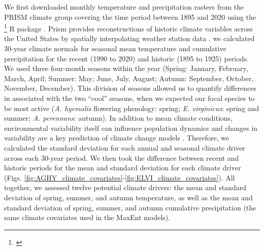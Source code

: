 \documentclass[11pt]{article}
\let\cite\citep
\newcommand{\tom}[2]{{\color{red}{#1}}\footnote{\textit{\color{red}{#2}}}}
\newcommand{\revise}[1]{{\color{Mahogany}{#1}}}
\begin{document}
We first downloaded monthly temperature and precipitation rasters from the PRISM climate group \citep{daly2013prism} covering the time period between 1895 and 2020 using the \tom{'prism'}{Other package names are not 'quoted'.} R package \citep{Rprism2015}. 
Prism provides reconstructions of historic climate variables across the United States by spatially interpolating weather station data \citep{diLuzio2008constructing}. 
\linelabel{R3C3-begin}\revise{Because the magnitude of observed climate change differs across seasons, and because different growing seasons is a key feature of the biology of our focal host species,} we calculated 30-year climate normals for seasonal mean temperature and cumulative precipitation for the recent (1990 to 2020) and historic (1895 to 1925) periods.
We used three four-month seasons within the year (Spring: January, February, March, April; Summer: May; June, July, August; Autumn: September, October, November, December). 
This division of seasons allowed us to quantify differences in \revise{the primary climate change drivers, temperature and precipitation,} associated with the two ``cool'' seasons, when we expected our focal species to be most active (\emph{A. hyemalis} flowering phenology: spring; \emph{E. virginicus}: spring and summer; \emph{A. perennans}: autumn). 
In addition to mean climate conditions, environmental variability itself can influence population dynamics \cite{tuljapurkar_population_1982} and changes in variability are a key prediction of climate change models \cite{stocker2013technical, ipcc_2021}. 
Therefore, we calculated the standard deviation for each annual and seasonal climate driver across each 30-year period.
We then took the difference between recent and historic periods for the mean and standard deviation for each climate driver (Figs. \ref{fig:AGHY_climate_covariates}-\ref{fig:ELVI_climate_covariates}).
All together, we assessed twelve potential climate drivers: the mean and standard deviation of spring, summer, and autumn temperature, as well as the mean and standard deviation of spring, summer, and autumn cumulative precipitation (the same climate covariates used in the MaxEnt models).
\end{document}
